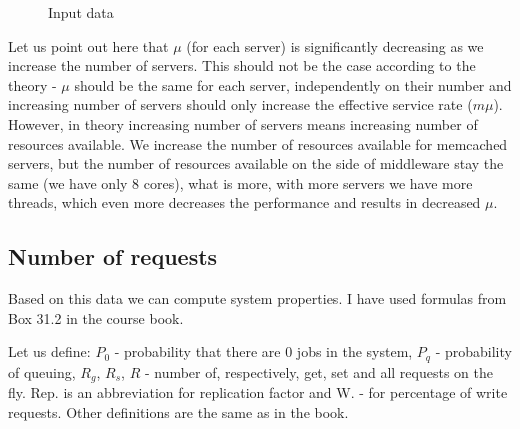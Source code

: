 \documentclass[11pt]{article}
\newcommand{\rowstyle}[1]{\gdef\currentrowstyle{#1}%
  #1\ignorespaces
}
\begin{document}
\begin{figure}
{\small
\begin{center}
\end{center}
}
\caption{Input data}
\label{fig:input}
\end{figure}

Let us point out here that $\mu$ (for each server) is significantly decreasing as we increase the number of servers. This should not be the case according to the theory - $\mu$ should be the same for each server, independently on their number and increasing number of servers should only increase the effective service rate ($m\mu$). However, in theory increasing number of servers means increasing number of resources available. We increase the number of resources available for memcached servers, but the number of resources available on the side of middleware stay the same (we have only 8 cores), what is more, with more servers we have more threads, which even more decreases the performance and results in decreased $\mu$.

\subsection{Number of requests}

Based on this data we can compute system properties. I have used formulas from Box 31.2 in the course book.

Let us define: $P_0$ - probability that there are 0 jobs in the system, $P_q$ - probability of queuing, $R_g$, $R_s$, $R$ - number of, respectively, get, set and all requests on the fly. Rep. is an abbreviation for replication factor and W. - for percentage of write requests. Other definitions are the same as in the book.
\end{document}
